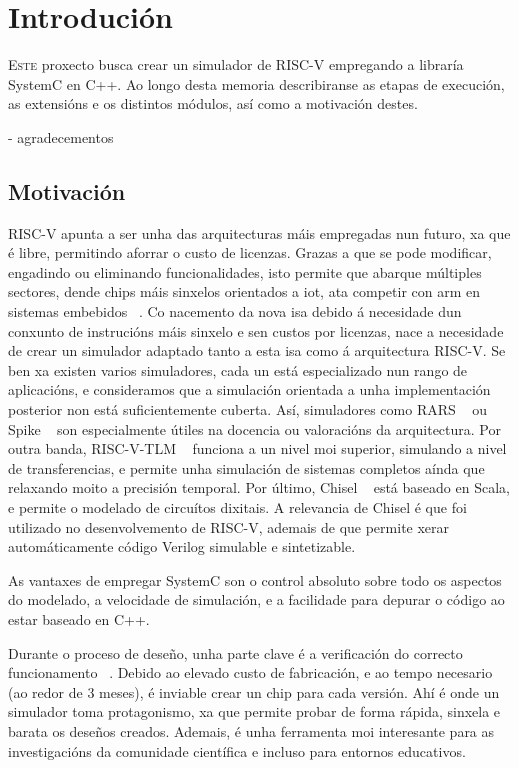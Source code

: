 \chapter{Introdución}
\label{chap:introducion}

\lettrine{E}{ste} proxecto busca crear un simulador de RISC-V empregando a libraría SystemC en C++. Ao longo desta memoria describiranse as etapas de execución, as extensións e os distintos módulos, así como a motivación destes.

 - agradecementos

\section{Motivación}
\label{sec:motivación}
RISC-V apunta a ser unha das arquitecturas máis empregadas nun futuro, xa que é libre, permitindo aforrar o custo de licenzas. Grazas a que se pode modificar, engadindo ou eliminando funcionalidades, isto permite que abarque múltiples sectores, dende \gls{chips} máis sinxelos orientados a \acrfull{iot}, ata competir con \acrshort{arm} en sistemas embebidos ~\cite{RISCV_IoT,RISCV_vsARM}. Co nacemento da nova \acrfull{isa} debido á necesidade dun conxunto de instrucións máis sinxelo e sen custos por licenzas, nace a necesidade de crear un simulador adaptado tanto a esta \acrshort{isa} como á arquitectura RISC-V. Se ben xa existen varios simuladores, cada un está especializado nun rango de aplicacións, e consideramos que a simulación orientada a unha implementación posterior non está suficientemente cuberta. Así, simuladores como RARS ~\cite{rars} ou Spike ~\cite{sim_spike} son especialmente útiles na docencia ou valoracións da arquitectura. Por outra banda, RISC-V-TLM ~\cite{riscv_tlm} funciona a un nivel moi superior, simulando a nivel de transferencias, e permite unha simulación de sistemas completos aínda que relaxando moito a precisión temporal. Por último, Chisel ~\cite{chisel} está baseado en Scala, e permite o modelado de circuítos dixitais. A relevancia de Chisel é que foi utilizado no desenvolvemento de RISC-V, ademais de que permite xerar automáticamente código Verilog simulable e sintetizable.

As vantaxes de empregar SystemC son o control absoluto sobre todo os aspectos do modelado, a velocidade de simulación, e a facilidade para depurar o código ao estar baseado en C++.

Durante o proceso de deseño, unha parte clave é a verificación do correcto funcionamento ~\cite{ChipVerify_verification,RISCV_verification}. Debido ao elevado custo de fabricación, e ao tempo necesario (ao redor de 3 meses), é inviable crear un chip para cada versión. Ahí é onde un simulador toma protagonismo, xa que permite probar de forma rápida, sinxela e barata os deseños creados. Ademais, é unha ferramenta moi interesante para as investigacións da comunidade científica e incluso para entornos educativos.

